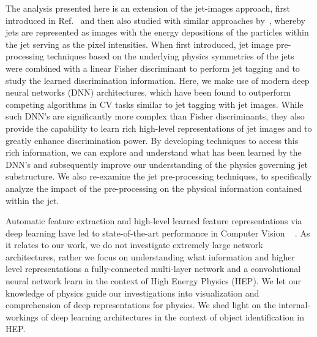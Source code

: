 \documentclass{article}
\begin{document}
The analysis presented here is an extension of the jet-images approach, first introduced in Ref.~\cite{Cogan:2014oua} and then also studied with similar approaches by~\cite{Almeida:2015jua}, whereby jets are represented as images with the energy depositions of the particles within the jet serving as the pixel intensities.  When first introduced, jet image pre-processing techniques based on the underlying physics symmetries of the jets were combined with a linear Fisher discriminant to perform jet tagging and to study the learned discrimination information.  Here, we make use of modern deep neural networks (DNN) architectures, which have been found to outperform competing algorithms in CV tasks similar to jet tagging with jet images.  While such DNN's are significantly more complex than Fisher discriminants, they also provide the capability to learn rich high-level representations of jet images and to greatly enhance discrimination power.  By developing techniques to access this rich information, we can explore and understand what has been learned by the DNN's and subsequently improve our understanding of the physics governing jet substructure.  We also re-examine the jet pre-processing techniques, to specifically analyze the impact of the pre-processing on the physical information contained within the jet.

%

Automatic feature extraction and high-level learned feature representations via deep learning have led to state-of-the-art performance in Computer Vision ~\cite{vggnet} \cite{maxout:goodfellow} \cite{dropout:and:LRN}. As it relates to our work, we do not investigate extremely large network architectures, rather we focus on  understanding what information and higher level representations a fully-connected multi-layer network and a convolutional neural network learn in the context of High Energy Physics (HEP). We let our knowledge of physics guide our investigations into visualization and comprehension of deep representations for physics. We shed light on the internal-workings of deep learning architectures in the context of object identification in HEP.
\end{document}
